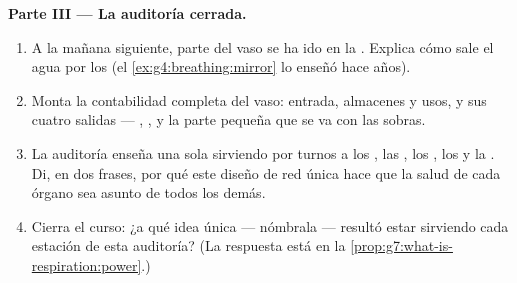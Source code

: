 \begin{problem}
\medskip\noindent\textbf{Parte III --- La auditoría cerrada.}
\begin{enumerate}[resume]
  \item A la mañana siguiente, parte del vaso se ha ido en la
        . Explica cómo sale el agua por los  (el
        \cref{ex:g4:breathing:mirror} lo enseñó hace años).
  \item Monta la contabilidad completa del vaso: entrada, almacenes y
        usos, y sus cuatro salidas --- , ,  y la
        parte pequeña que se va con las sobras.
  \item La auditoría enseña una sola  sirviendo por turnos a los
        , las , los , los  y la
        . Di, en dos frases, por qué este diseño de red única hace
        que la salud de cada órgano sea asunto de todos los demás.
  \item Cierra el curso: ¿a qué idea única --- nómbrala --- resultó
        estar sirviendo cada estación de esta auditoría? (La respuesta
        está en la \cref{prop:g7:what-is-respiration:power}.)
\end{enumerate}
\end{problem}
